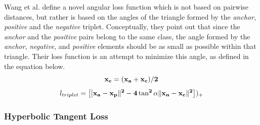 Wang et al. \cite{DBLP:journals/corr/abs-1708-01682} define a novel angular loss function which is not based on pairwise distances, but rather is based on the angles of the triangle formed by the \textit{anchor}, \textit{positive} and the \textit{negative} triplet.  Conceptually, they point out that since the \textit{anchor} and the \textit{positive} pairs belong to the same class, the angle formed by the \textit{anchor}, \textit{negative}, and \textit{positive} elements should be as small as possible within that triangle.  Their loss function is an attempt to minimize this angle, as defined in the equation below.
\begin{equation}
\bf{x_{c}} = (\bf{x_{a}} + \bf{x_{c}}) / 2
\end{equation}
\begin{equation}
l_{triplet} = \left[[\bf{x_{a}} - \bf{x_{p}}\|^2 - 4 \tan^2 \alpha \|\bf{x_{n}} - \bf{x_{c}}\|^2 \right])_{+}
\end{equation}

\subsubsection{Hyperbolic Tangent Loss}

